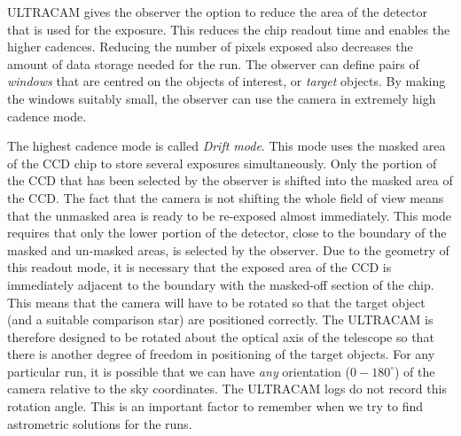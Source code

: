 ULTRACAM gives the observer the option to reduce the area of the detector that is used for the exposure. This reduces the chip readout time and enables the higher cadences. Reducing the number of pixels exposed also decreases the amount of data storage needed for the run. The observer can define pairs of \emph{windows} that are centred on the objects of interest, or \emph{target} objects. By making the windows suitably small, the observer can use the camera in extremely high cadence mode. 

The highest cadence mode is called \emph{Drift mode}. This mode uses the masked area of the CCD chip to store several exposures simultaneously. Only the portion of the CCD that has been selected by the observer is shifted into the masked area of the CCD. The fact that the camera is not shifting the whole field of view means that the unmasked area is ready to be re-exposed almost immediately. This mode requires that only the lower portion of the detector, close to the boundary of the masked and un-masked areas, is selected by the observer. Due to the geometry of this readout mode, it is necessary that the exposed area of the CCD is immediately adjacent to the boundary with the masked-off section of the chip. This means that the camera will have to be rotated so that the target object (and a suitable comparison star) are positioned correctly. The ULTRACAM is therefore designed to be rotated about the optical axis of the telescope so that there is another degree of freedom in positioning of the target objects. For any particular run, it is possible that we can have \emph{any} orientation ($0-180^{\circ}$) of the camera relative to the sky coordinates. The ULTRACAM logs do not record this rotation angle. This is an important factor to remember when we try to find astrometric solutions for the runs.    

